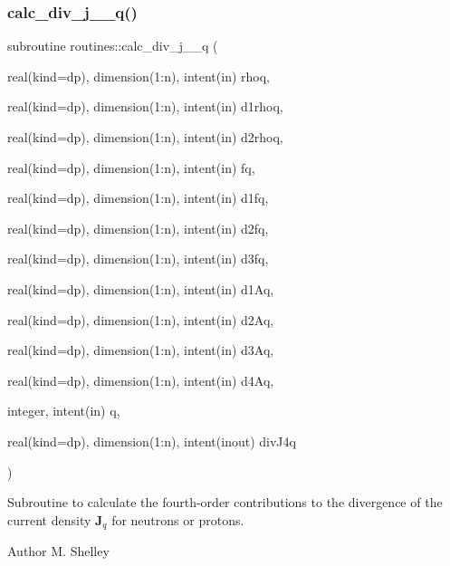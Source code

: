 \subsubsection{\texorpdfstring{calc\+\_\+div\+\_\+j\+\_\+\_\+q()}{calc\_div\_j\_4\_q()}}
{\footnotesize\ttfamily subroutine routines\+::calc\+\_\+div\+\_\+j\+\_\+\_\+q (\begin{DoxyParamCaption}\item[{real(kind=dp), dimension(1\+:n), intent(in)}]{rhoq,  }\item[{real(kind=dp), dimension(1\+:n), intent(in)}]{d1rhoq,  }\item[{real(kind=dp), dimension(1\+:n), intent(in)}]{d2rhoq,  }\item[{real(kind=dp), dimension(1\+:n), intent(in)}]{fq,  }\item[{real(kind=dp), dimension(1\+:n), intent(in)}]{d1fq,  }\item[{real(kind=dp), dimension(1\+:n), intent(in)}]{d2fq,  }\item[{real(kind=dp), dimension(1\+:n), intent(in)}]{d3fq,  }\item[{real(kind=dp), dimension(1\+:n), intent(in)}]{d1\+Aq,  }\item[{real(kind=dp), dimension(1\+:n), intent(in)}]{d2\+Aq,  }\item[{real(kind=dp), dimension(1\+:n), intent(in)}]{d3\+Aq,  }\item[{real(kind=dp), dimension(1\+:n), intent(in)}]{d4\+Aq,  }\item[{integer, intent(in)}]{q,  }\item[{real(kind=dp), dimension(1\+:n), intent(inout)}]{div\+J4q }\end{DoxyParamCaption})}



Subroutine to calculate the fourth-\/order contributions to the divergence of the current density $\textbf{J}_q$ for neutrons or protons. 

\begin{DoxyAuthor}{Author}
M. Shelley 
\end{DoxyAuthor}

